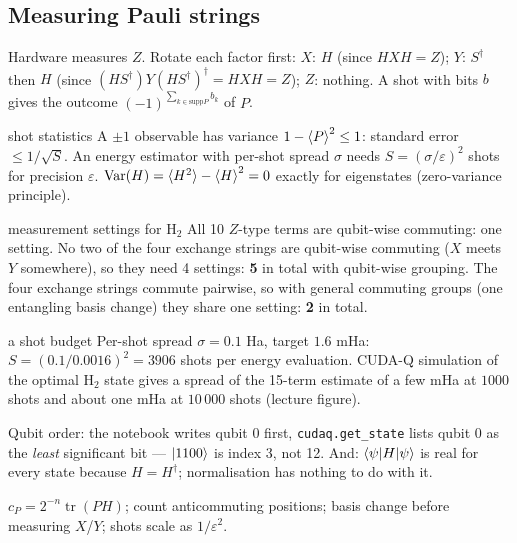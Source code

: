 \documentclass[11pt,a4paper,openany]{book}
\newcounter{wex}[chapter]
\begin{document}
\subsection{Measuring Pauli strings}
Hardware measures $Z$. Rotate each factor first: $X$: $H$ (since $HXH = Z$); $Y$: $S^\dagger$ then $H$ (since $(HS^\dagger)Y(HS^\dagger)^\dagger = HXH = Z$); $Z$: nothing.
A shot with bits $b$ gives the outcome $(-1)^{\sum_{k\in\mathrm{supp}P}b_k}$ of $P$.
\begin{keyres}{shot statistics}
A $\pm1$ observable has variance $1 - \braket P^2 \le 1$: standard error $\le 1/\sqrt S$. An energy estimator with per-shot spread $\sigma$ needs
$S = (\sigma/\varepsilon)^2$ shots for precision $\varepsilon$. $\mathrm{Var}(H) = \braket{H^2} - \braket H^2 = 0$ exactly for eigenstates (zero-variance principle).
\end{keyres}
\begin{wexample}{measurement settings for H$_2$}
All 10 $Z$-type terms are qubit-wise commuting: one setting. No two of the four exchange strings are qubit-wise commuting ($X$ meets $Y$
somewhere), so they need 4 settings: \textbf{5} in total with qubit-wise grouping. The four exchange strings commute pairwise, so with general
commuting groups (one entangling basis change) they share one setting: \textbf{2} in total.
\end{wexample}
\begin{wexample}{a shot budget}
Per-shot spread $\sigma = 0.1$ Ha, target $1.6$ mHa: $S = (0.1/0.0016)^2 = 3906$ shots per energy evaluation. CUDA-Q simulation of the optimal H$_2$ state
gives a spread of the 15-term estimate of a few mHa at $1000$ shots and about one mHa at $10\,000$ shots (lecture figure).
\end{wexample}
\begin{trap}
Qubit order: the notebook writes qubit 0 first, \texttt{cudaq.get\_state} lists qubit 0 as the \emph{least} significant bit --- $\ket{1100}$ is index 3, not 12.
And: $\braket{\psi|H|\psi}$ is real for every state because $H = H^\dagger$; normalisation has nothing to do with it.
\end{trap}
\begin{checklist}
$c_P = 2^{-n}\operatorname{tr}(PH)$; count anticommuting positions; basis change before measuring $X$/$Y$; shots scale as $1/\varepsilon^2$.
\end{checklist}

\end{document}

